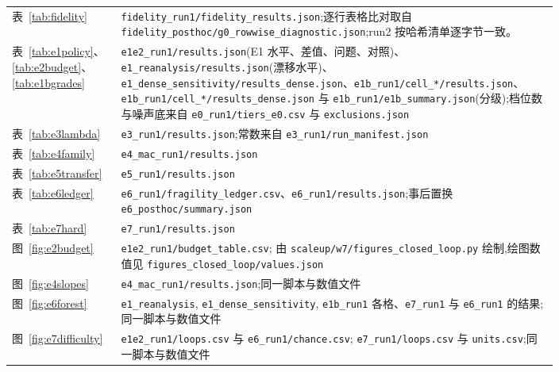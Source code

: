 \documentclass[11pt,a4paper]{ctexart}
\begin{document}
{\begin{longtable}{lp{0.80\linewidth}}
表~\ref{tab:fidelity} & \texttt{fidelity\_\allowbreak run1/\allowbreak fidelity\_\allowbreak results.json};逐行表格比对取自 \texttt{fidelity\_\allowbreak posthoc/\allowbreak g0\_\allowbreak rowwise\_\allowbreak diagnostic.json};run2 按哈希清单逐字节一致。 \\
表~\ref{tab:e1policy}、\ref{tab:e2budget}、\ref{tab:e1bgrades} & \texttt{e1e2\_\allowbreak run1/\allowbreak results.json}(E1 水平、差值、问题、对照)、\texttt{e1\_\allowbreak reanalysis/\allowbreak results.json}(漂移水平)、\texttt{e1\_\allowbreak dense\_\allowbreak sensitivity/\allowbreak results\_\allowbreak dense.json}、\texttt{e1b\_\allowbreak run1/\allowbreak cell\_*/\allowbreak results.json}、\texttt{e1b\_\allowbreak run1/\allowbreak cell\_*/\allowbreak results\_\allowbreak dense.json} 与 \texttt{e1b\_\allowbreak run1/\allowbreak e1b\_\allowbreak summary.json}(分级);档位数与噪声底来自 \texttt{e0\_\allowbreak run1/\allowbreak tiers\_\allowbreak e0.csv} 与 \texttt{exclusions.json} \\
表~\ref{tab:e3lambda} & \texttt{e3\_\allowbreak run1/\allowbreak results.json};常数来自 \texttt{e3\_\allowbreak run1/\allowbreak run\_\allowbreak manifest.json} \\
表~\ref{tab:e4family} & \texttt{e4\_\allowbreak mac\_\allowbreak run1/\allowbreak results.json} \\
表~\ref{tab:e5transfer} & \texttt{e5\_\allowbreak run1/\allowbreak results.json} \\
表~\ref{tab:e6ledger} & \texttt{e6\_\allowbreak run1/\allowbreak fragility\_\allowbreak ledger.csv}、\texttt{e6\_\allowbreak run1/\allowbreak results.json};事后置换 \texttt{e6\_\allowbreak posthoc/\allowbreak summary.json} \\
表~\ref{tab:e7hard} & \texttt{e7\_\allowbreak run1/\allowbreak results.json} \\
图~\ref{fig:e2budget} & \texttt{e1e2\_\allowbreak run1/\allowbreak budget\_\allowbreak table.csv}; 由 \texttt{scaleup/\allowbreak w7/\allowbreak figures\_\allowbreak closed\_\allowbreak loop.py} 绘制,绘图数值见 \texttt{figures\_\allowbreak closed\_\allowbreak loop/\allowbreak values.json} \\
图~\ref{fig:e4slopes} & \texttt{e4\_\allowbreak mac\_\allowbreak run1/\allowbreak results.json};同一脚本与数值文件 \\
图~\ref{fig:e6forest} & \texttt{e1\_\allowbreak reanalysis}, \texttt{e1\_\allowbreak dense\_\allowbreak sensitivity}, \texttt{e1b\_\allowbreak run1} 各格、\texttt{e7\_\allowbreak run1} 与 \texttt{e6\_\allowbreak run1} 的结果;同一脚本与数值文件 \\
图~\ref{fig:e7difficulty} & \texttt{e1e2\_\allowbreak run1/\allowbreak loops.csv} 与 \texttt{e6\_\allowbreak run1/\allowbreak chance.csv}; \texttt{e7\_\allowbreak run1/\allowbreak loops.csv} 与 \texttt{units.csv};同一脚本与数值文件 \\
\bottomrule
\end{longtable}
}
\addtocounter{table}{-1}
\end{document}

